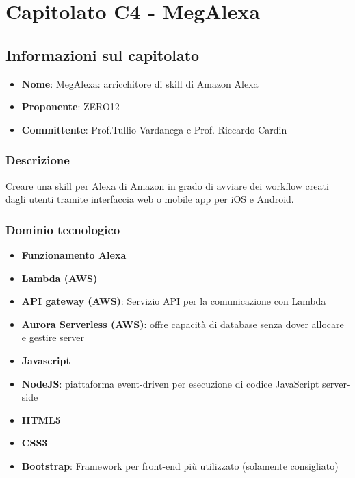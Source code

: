 \section{Capitolato C4 - MegAlexa}
\subsection{Informazioni sul capitolato}
\begin{itemize}
    \item \textbf{Nome}: MegAlexa: arricchitore di skill di Amazon Alexa
	\item \textbf{Proponente}: ZERO12
	\item \textbf{Committente}: Prof.Tullio Vardanega e Prof. Riccardo Cardin
\end{itemize}
\subsubsection{Descrizione}
Creare una skill per Alexa di Amazon in grado di avviare dei workflow creati dagli utenti tramite interfaccia web o
mobile app per iOS e Android.
\subsubsection{Dominio tecnologico}
\begin{itemize}
    \item \textbf{Funzionamento Alexa}
    \item \textbf{Lambda (AWS)}
    \item \textbf{API gateway (AWS)}: Servizio API per la comunicazione con Lambda
    \item \textbf{Aurora Serverless (AWS)}: offre capacità di database senza dover allocare e gestire server
    \item \textbf{Javascript}
    \item \textbf{NodeJS}: piattaforma event-driven per esecuzione di codice JavaScript server-side
    \item \textbf{HTML5}
    \item \textbf{CSS3}
    \item \textbf{Bootstrap}: Framework per front-end più utilizzato (solamente consigliato)
\end{itemize}
